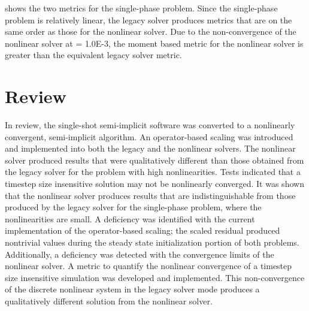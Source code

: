  shows the two metrics for the single-phase problem.
Since the single-phase problem is relatively linear, the legacy solver produces metrics that are on the same order as those for the nonlinear solver.
Due to the non-convergence of the nonlinear solver at \dtmax{} = 1.0E-3, the moment based metric for the nonlinear solver is greater than the equivalent legacy solver metric.

\section{Review}
\label{sect:review}

In review, the single-shot semi-implicit \cobra{} software was converted to a nonlinearly convergent, semi-implicit algorithm.
An operator-based scaling was introduced and implemented into both the legacy and the nonlinear \cobra{} solvers.
The nonlinear solver produced results that were qualitatively different than those obtained from the legacy solver for the problem with high nonlinearities.
Tests indicated that a timestep size insensitive solution may not be nonlinearly converged.
It was shown that the nonlinear solver produces results that are indistinguishable from those produced by the legacy solver for the single-phase problem,  where the nonlinearities are small.
A deficiency was identified with the current implementation of the operator-based scaling; the scaled residual produced nontrivial values during the steady state initialization portion of both problems.
Additionally, a deficiency was detected with the convergence limits of the nonlinear solver.
A metric to quantify the nonlinear convergence of a timestep size insensitive simulation was developed and implemented.
This non-convergence of the discrete nonlinear system in the legacy solver mode produces a qualitatively different solution from the nonlinear solver.